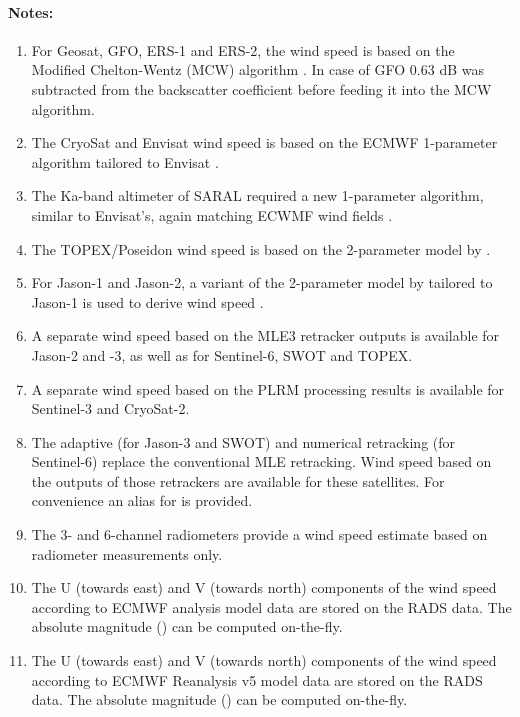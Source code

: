 \documentclass[a4paper,11pt,openany,natbib,nomargin]{thesis}
\newenvironment{notes}[1][Notes:]{\FloatBarrier\paragraph{#1}\begin{enumerate}}{\end{enumerate}}
\begin{document}
\begin{notes}
\item For Geosat, GFO, ERS-1 and ERS-2, the wind speed is based on the Modified Chelton-Wentz (MCW) algorithm \citep{witter1991}. In case of GFO 0.63 dB was subtracted from the backscatter coefficient before feeding it into the MCW algorithm.\label{item:wind_speed_mcw}
\item The CryoSat and Envisat wind speed is based on the ECMWF 1-parameter algorithm tailored to Envisat \citep{abdalla2007}.\label{item:wind_speed_abdalla}
\item The Ka-band altimeter of SARAL required a new 1-parameter algorithm, similar to Envisat's, again matching ECWMF wind fields \citep{lillibridge2014}.\label{item:wind_speed_saral}
\item The TOPEX/Poseidon wind speed is based on the 2-parameter model by \citet{gourrion2002}.\label{item:wind_speed_topex}
\item For Jason-1 and Jason-2, a variant of the 2-parameter model by \citet{gourrion2002} tailored to Jason-1 is used to derive wind speed \citep{collard2005}.\label{item:wind_speed_jason}
\item A separate wind speed based on the MLE3 retracker outputs is available for Jason-2 and -3, as well as for Sentinel-6, SWOT and TOPEX.\label{item:wind_speed_alt_mle3}
\item A separate wind speed based on the PLRM processing results is available for Sentinel-3 and CryoSat-2.\label{item:wind_speed_alt_plrm}
\item The adaptive (for Jason-3 and SWOT) and numerical retracking (for Sentinel-6) replace the conventional MLE retracking. Wind speed based on the outputs of those retrackers are available for these satellites. For convenience an alias  for  is provided.\label{item:wind_speed_alt_adaptive}\label{item:wind_speed_alt_nr}
\item The 3- and 6-channel radiometers provide a wind speed estimate based on radiometer measurements only.\label{item:wind_speed_rad}
\item The U (towards east) and V (towards north) components of the wind speed according to ECMWF analysis model data are stored on the RADS data. The absolute magnitude () can be computed on-the-fly.\label{item:wind_speed_ecmwf}
\item The U (towards east) and V (towards north) components of the wind speed according to ECMWF Reanalysis v5 model data are stored on the RADS data. The absolute magnitude () can be computed on-the-fly.\label{item:wind_speed_era5}
\end{notes}
\end{document}
